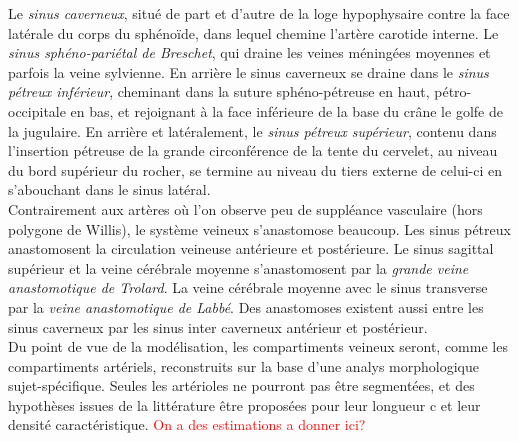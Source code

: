 Le {\em sinus caverneux}, situé de part et d’autre de la loge hypophysaire contre la face latérale du corps du sphénoïde, dans lequel chemine l’artère carotide interne. Le {\em sinus sphéno-pariétal de Breschet}, qui draine les veines méningées moyennes et parfois la veine sylvienne. En arrière le sinus caverneux se draine dans le {\em sinus pétreux inférieur}, cheminant dans la suture sphéno-pétreuse en haut, pétro-occipitale en bas, et rejoignant à la face inférieure de la base du crâne le golfe de la jugulaire. En arrière et latéralement, le {\em sinus pétreux supérieur}, contenu dans l’insertion pétreuse de la grande circonférence de la tente du cervelet, au niveau du bord supérieur du rocher, se termine au niveau du tiers externe de celui-ci en s’abouchant dans le sinus latéral.\\
Contrairement aux artères où l’on observe peu de suppléance vasculaire (hors polygone de Willis), le système veineux s’anastomose beaucoup. Les sinus pétreux anastomosent la circulation veineuse antérieure et postérieure. Le sinus sagittal supérieur et la veine cérébrale moyenne s’anastomosent par la {\em grande veine anastomotique de Trolard}. La veine cérébrale moyenne avec le sinus transverse par la {\em veine anastomotique de Labbé}. Des anastomoses existent aussi entre les sinus caverneux par les sinus inter caverneux antérieur et postérieur.\\
Du point de vue de la modélisation, les compartiments veineux seront, comme les compartiments artériels, reconstruits sur la base d'une analys morphologique sujet-spécifique. Seules les artérioles ne pourront pas être segmentées, et des hypothèses issues de la littérature être proposées pour leur longueur c et leur densité caractéristique. \textcolor{red}{On a des estimations a donner ici?}
